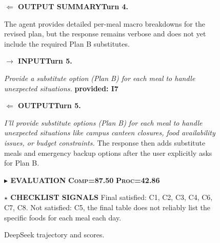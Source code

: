 \documentclass{llmxive}
\providecommand{\caseZhangshunkaiOneTag}[3]{    {\setlength{\fboxsep}{1.6pt}\colorbox{#1}{\scriptsize\textbf{#3}}}}
\providecommand{\caseZhangshunkaiOneLine}[3]{    \caseZhangshunkaiOneTag{#1}{#2}{#3}\hspace{3pt}}
\providecommand{\caseZhangshunkaiOneIO}[3]{    \vspace{2pt}
    \noindent\caseZhangshunkaiOneLine{#1}{white}{#2}\textbf{#3}
}
\begin{document}
\begin{figure}[!htbp]
{    \caseZhangshunkaiOneIO{green!45!black}{$\Leftarrow$ OUTPUT SUMMARY}{Turn 4.}
    The agent provides detailed per-meal macro breakdowns for the revised plan, but the response remains verbose and does not yet include the required Plan B substitutes.

    \vspace{3pt}
    \caseZhangshunkaiOneIO{blue!65!black}{$\rightarrow$ INPUT}{Turn 5.}
    \emph{Provide a substitute option (Plan B) for each meal to handle unexpected situations.}
    \caseZhangshunkaiOneTag{red!15}{red!70!black}{provided: I7}

    \caseZhangshunkaiOneIO{green!45!black}{$\Leftarrow$ OUTPUT}{Turn 5.}
    \emph{I'll provide substitute options (Plan B) for each meal to handle unexpected situations like campus canteen closures, food availability issues, or budget constraints.}
    The response then adds substitute meals and emergency backup options after the user explicitly asks for Plan B.

    \vspace{5pt}
    \caseZhangshunkaiOneLine{purple!70!black}{white}{$\blacktriangleright$ EVALUATION}
    \caseZhangshunkaiOneTag{orange!15}{orange!80!black}{\textsc{Comp}=87.50}
    \hspace{3pt}
    \caseZhangshunkaiOneTag{cyan!15}{cyan!45!black}{\textsc{Proc}=42.86}

    \vspace{3pt}
    \noindent\caseZhangshunkaiOneLine{orange!80!black}{white}{$\star$ CHECKLIST SIGNALS}
    Final satisfied: C1, C2, C3, C4, C6, C7, C8.
    Not satisfied: C5, the final table does not reliably list the specific foods for each meal each day.
    }
    \caption{DeepSeek trajectory and scores.}
    \label{fig:case_zhangshunkai_1_deepseek_trajectory}
\end{figure}
\end{document}
